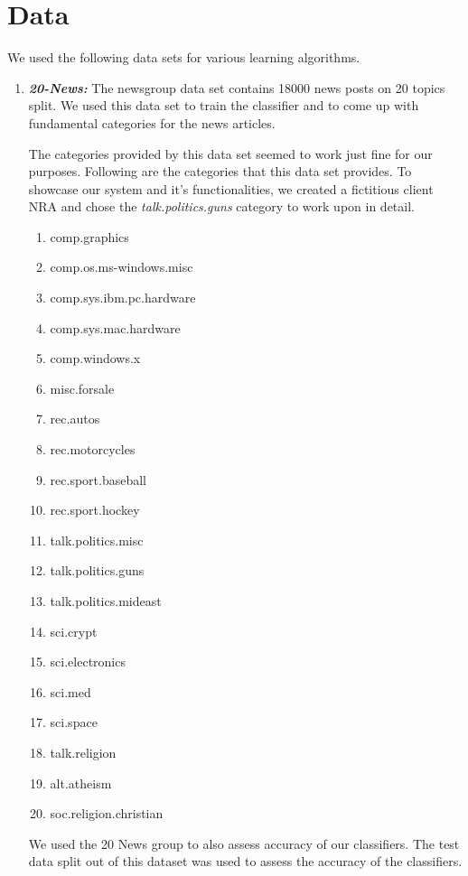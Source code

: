 \documentclass[paper=a4, fontsize=11pt]{scrartcl}
\numberwithin{equation}{section}		%
\numberwithin{figure}{section}			%
\numberwithin{table}{section}				%
\begin{document}
\section{Data}
We used the following data sets for various learning algorithms.

\begin {enumerate}

\item \textbf{\textit{20-News:} }
The newsgroup data set contains 18000 news posts on 20 topics split. We used this data set to train the classifier and to come up with fundamental categories for the news articles.

The categories provided by this data set seemed to work just fine for our purposes. Following are the categories that this data set provides. To showcase our system and it's functionalities, we created a fictitious client NRA and chose the \textit{talk.politics.guns} category to work upon in detail.

\begin {enumerate}
\item {comp.graphics}
\item {comp.os.ms-windows.misc}
\item {comp.sys.ibm.pc.hardware}
\item {comp.sys.mac.hardware}
\item {comp.windows.x}
\item {misc.forsale}
\item {rec.autos}
\item {rec.motorcycles}
\item {rec.sport.baseball}
\item {rec.sport.hockey}
\item {talk.politics.misc}
\item {talk.politics.guns}
\item { talk.politics.mideast}
\item {sci.crypt}
\item {sci.electronics}
\item {sci.med}
\item {sci.space}
\item {talk.religion}
\item {alt.atheism}
\item {soc.religion.christian}
\end {enumerate}

We used the 20 News group to also assess accuracy of our classifiers. The test data split out of this dataset was used to assess the accuracy of the classifiers.


\end{enumerate}
\end{document}
